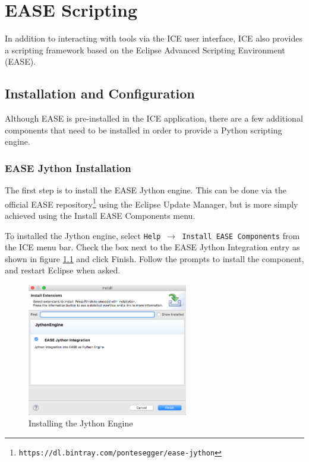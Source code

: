 \chapter{EASE Scripting}

In addition to interacting with tools via the ICE user interface, ICE also
provides a scripting framework based on the Eclipse Advanced Scripting
Environment (EASE). 

\section{Installation and Configuration}

Although EASE is pre-installed in the ICE application, there are a few
additional components that need to be installed in order to provide a Python
scripting engine.

\subsection{EASE Jython Installation} 

The first step is to install the EASE Jython engine. This can be done via the
official EASE
repository\footnote{\texttt{https://dl.bintray.com/pontesegger/ease-jython}}
using the Eclipse Update Manager, but is more simply achieved using the Install EASE Components menu.

To installed the Jython engine, select \texttt{Help $\rightarrow$ Install
EASE Components} from the ICE menu bar. Check the box next to the EASE Jython
Integration entry as shown in figure \ref{fig:jython} and click Finish. Follow
the prompts to install the component, and restart Eclipse when asked.

\begin{figure}[!hb]
\centering
\includegraphics[width=7cm]{images/ease-marketplace}
\caption{Installing the Jython Engine}
\label{fig:jython}
\end{figure}

